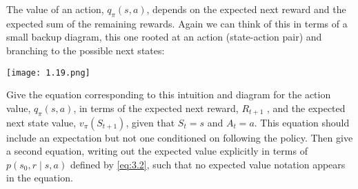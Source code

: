
\begin{exercise}[Exercise 3.19]

The value of an action, $q_\pi(s, a)$, depends on the expected next reward and the expected sum of the remaining rewards.
Again we can think of this in terms of a small backup diagram, this one rooted at an action (state-action pair) and branching to the possible next states:

\begin{center}
    \texttt{[image: 1.19.png]}
\end{center}

Give the equation corresponding to this intuition and diagram for the action value, $q_\pi(s, a)$, in terms of the expected next reward, $R_{t+1}$ , and the expected next state value, $v_\pi(S_{t+1})$, given that $S_t = s$ and $A_t = a$.
This equation should include an expectation but not one conditioned on following the policy.
Then give a second equation, writing out the expected value explicitly in terms of $p(s_0, r \mid s, a)$ defined by \eqref{eq:3.2}, such that no expected value notation appears in the equation.

\end{exercise}


